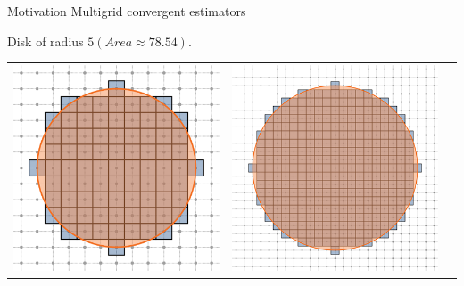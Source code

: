 \begin{frame}
{Motivation}
{Multigrid convergent estimators}

\footnotesize

\center
Disk of radius $5 (Area\approx78.54).$ 

\center
\begin{tabular}{ccc}
\includegraphics[scale=0.4]{figures/motivation/digital-geometric-estimators/multigrid/h1.png} &
\includegraphics[scale=0.4]{figures/motivation/digital-geometric-estimators/multigrid/h05.png} &

\end{tabular}
\end{frame}
